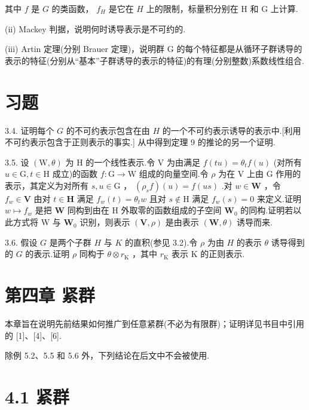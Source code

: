 \documentclass[10pt]{article}
\begin{document}
其中 \(f\) 是 \(G\) 的类函数， \({f}_{H}\) 是它在 \(H\) 上的限制，标量积分别在 \(\mathrm{H}\) 和 \(\mathrm{G}\) 上计算.

(ii) Mackey 判据，说明何时诱导表示是不可约的.

(iii) Artin 定理(分别 Brauer 定理)，说明群 G 的每个特征都是从循环子群诱导的表示的特征(分别从“基本”子群诱导的表示的特征)的有理(分别整数)系数线性组合.

\section*{习题}

3.4. 证明每个 \(G\) 的不可约表示包含在由 \(H\) 的一个不可约表示诱导的表示中.[利用不可约表示包含于正则表示的事实.] 从中得到定理 9 的推论的另一个证明.

3.5. 设 \(\left( {\mathrm{W},\theta }\right)\) 为 \(\mathrm{H}\) 的一个线性表示.令 \(\mathrm{V}\) 为由满足 \(f\left( {tu}\right)  = {\theta }_{t}f\left( u\right)\) (对所有 \(u \in  \mathrm{G},t \in  \mathrm{H}\) 成立)的函数 \(f : \mathrm{G} \rightarrow  \mathrm{W}\) 组成的向量空间.令 \(\rho\) 为在 \(\mathrm{V}\) 上由 \(\mathrm{G}\) 作用的表示，其定义为对所有 \(s,u \in  \mathrm{G}\) ， \(\left( {{\rho }_{s}f}\right) \left( u\right)  = f\left( {us}\right)\) .对 \(w \in  \mathbf{W}\) ，令 \({f}_{w} \in  \mathbf{V}\) 由对 \(t \in  \mathbf{H}\) 满足 \({f}_{w}\left( t\right)  = {\theta }_{t}w\) 且对 \(s \notin  \mathrm{H}\) 满足 \({f}_{w}\left( s\right)  = 0\) 来定义.证明 \(w \mapsto  {f}_{w}\) 是把 \(\mathbf{W}\) 同构到由在 H 外取零的函数组成的子空间 \({\mathbf{W}}_{0}\) 的同构.证明若以此方式将 W 与 \({\mathbf{W}}_{0}\) 识别，则表示 \(\left( {\mathbf{V},\rho }\right)\) 是由表示 \(\left( {\mathbf{W},\theta }\right)\) 诱导而来.

3.6. 假设 \(G\) 是两个子群 \(H\) 与 \(K\) 的直积(参见 3.2).令 \(\rho\) 为由 \(H\) 的表示 \(\theta\) 诱导得到的 \(G\) 的表示.证明 \(\rho\) 同构于 \(\theta  \otimes  {r}_{\mathrm{K}}\) ，其中 \({r}_{\mathrm{K}}\) 表示 \(\mathrm{K}\) 的正则表示.

\section*{第四章 紧群}

本章旨在说明先前结果如何推广到任意紧群(不必为有限群)；证明详见书目中引用的 [1]、[4]、[6].

除例 5.2、5.5 和 5.6 外，下列结论在后文中不会被使用.

\section*{4.1 紧群}
\end{document}
